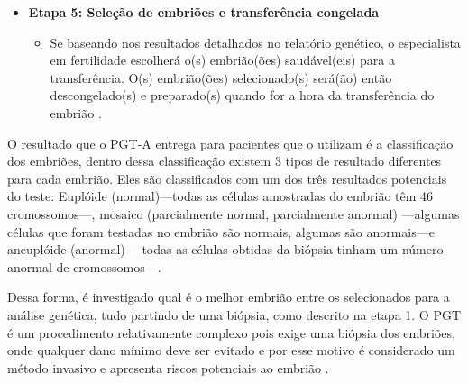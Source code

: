 \begin{itemize}
    \item \textbf{Etapa 5: Seleção de embriões e transferência congelada}
    \begin{itemize}
        \item Se baseando nos resultados detalhados no relatório genético, o especialista em fertilidade escolherá o(s) embrião(ões) saudável(eis) para a transferência. O(s) embrião(ões) selecionado(s) será(ão) então descongelado(s) e preparado(s) quando for a hora da transferência do embrião \cite{cnyfertility2024}. 
    \end{itemize}
\end{itemize}

O resultado que o PGT-A entrega para pacientes que o utilizam é a classificação dos embriões, dentro dessa classificação existem 3 tipos de resultado diferentes para cada embrião. Eles são classificados com um dos três resultados potenciais do teste: Euplóide (normal)—todas as células amostradas do embrião têm 46 cromossomos—, mosaico (parcialmente normal, parcialmente anormal) —algumas células que foram testadas no embrião são normais, algumas são anormais—e aneuplóide (anormal) —todas as células obtidas da biópsia tinham um número anormal de cromossomos—\cite{cnyfertility2024}.



%     

Dessa forma, é investigado qual é o melhor embrião entre os selecionados para a análise genética, tudo partindo de uma biópsia, como descrito na etapa 1. O PGT é um procedimento relativamente complexo pois exige uma biópsia dos embriões, onde qualquer dano mínimo deve ser evitado e por esse motivo é considerado um método invasivo e apresenta riscos potenciais ao embrião \cite{yang2024}.

